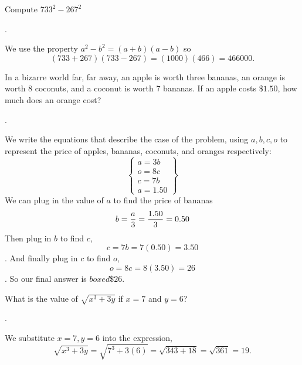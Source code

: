 \documentclass[11pt]{article}
\DeclareRobustCommand{\frac}[3][0pt]{%
  {\begingroup\hspace{#1}#2\hspace{#1}\endgroup\over\hspace{#1}#3\hspace{#1}}}
\begin{document}

\begin{problem}
Compute $733^2-267^2$
\end{problem}
\begin{answer}
.
\end{answer}
\begin{solution}
We use the property $a^2-b^2 = (a+b)(a-b)$ so
$$(733+267)(733-267) = (1000)(466) = \boxed{466000}.$$
\end{solution}

\begin{problem}In a bizarre world far, far away, an apple is worth three bananas, an orange is worth 8 coconuts, and a coconut is worth 7 bananas. If an apple costs $\$1.50$, how much does an orange cost?
\end{problem}
\begin{answer}
.
\end{answer}
\begin{solution}
We write the equations that describe the case of the problem, using $a, b, c, o$ to represent the price of apples, bananas, coconuts, and oranges respectively:
 \[
	\left\{
            	\begin{array}{ll}
              	a=3b\\
              	o=8c\\
              	c=7b \\
a=1.50
            	\end{array}
	\right\}
  \]
We can plug in the value of $a$ to find the price of bananas
$$b=\frac{a}{3} = \frac{1.50}{3} = 0.50$$
Then plug in $b$ to find $c$,
$$c=7b = 7(0.50) = 3.50$$.
And finally plug in $c$ to find $o$,
$$o=8c=8(3.50)=26$$.
So our final answer is $boxed{\$ 26}$.
\end{solution}


\begin{problem}What is the value of $\sqrt{x^{3}+3y}$ if $x=7$ and $y=6$?
\end{problem}
\begin{answer}
.
\end{answer}
\begin{solution}
We substitute $x=7, y=6$ into the expression,
$$\sqrt{x^{3}+3y}=\sqrt{7^3+3(6)}=\sqrt{343+18}=\sqrt{361}=\boxed{19}.$$
\end{solution}
\end{document}
